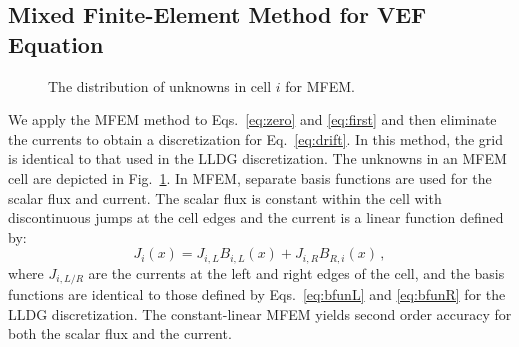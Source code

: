 
\subsection{Mixed Finite-Element Method for VEF Equation}
\begin{figure}
	\centering
	 
	\caption{The distribution of unknowns in cell $i$ for MFEM. }
	\label{fig:mfem_grid}
\end{figure}
We apply the MFEM method to Eqs.~\ref{eq:zero} and \ref{eq:first} and then eliminate the currents to obtain a discretization for Eq.~\ref{eq:drift}.  In this 
method, the grid is identical to that used in the LLDG \SN discretization. The unknowns in an MFEM cell are depicted in Fig.~\ref{fig:mfem_grid}. In MFEM, separate basis functions are used for the scalar flux and 
current. The scalar flux is constant within the cell with discontinuous jumps at the cell edges and the current is a linear function defined by: 
	\begin{equation} \label{eq:MFEM_current}
		J_i(x) = J_{i,L} B_{i,L}(x) + J_{i,R} B_{R,i}(x) \,, 
	\end{equation} 
where $J_{i,L/R}$ are the currents at the left and right edges of the cell, and the basis functions are identical to those 
defined by Eqs.~\ref{eq:bfunL} and \ref{eq:bfunR} for the LLDG \SN discretization. The constant-linear MFEM yields second 
order accuracy for both the scalar flux and the current.  

